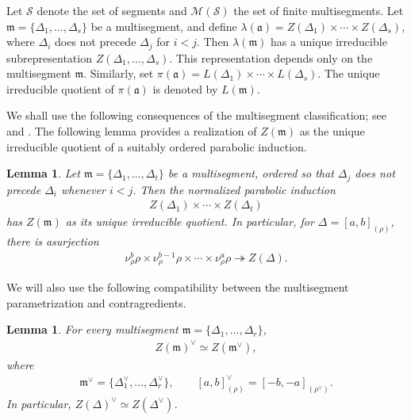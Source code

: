 \documentclass[11pt,leqno]{amsart}
\numberwithin{equation}{section}
\theoremstyle{plain}
\newtheorem{lemma}[theorem]{Lemma}
\theoremstyle{definition}
\theoremstyle{remark}
\newcommand{\onto}{\twoheadrightarrow}
\begin{document}
	
	Let $\mathcal S$ denote the set of segments and $\mathcal M(\mathcal S)$ the set of finite multisegments. 
	Let $\mathfrak m=\{\Delta_1,\ldots,\Delta_s\}$ be a multisegment, and define
	$\lambda(\mathfrak a)=Z(\Delta_1)\times\cdots\times Z(\Delta_s)$, where $\Delta_i$ does not precede $\Delta_j$ for $i<j$.
	Then $\lambda(\mathfrak m)$ has a unique irreducible
	subrepresentation $Z(\Delta_1,\ldots,\Delta_s)$.
	This representation depends only on the multisegment $\mathfrak m$.
	Similarly, set $\pi(\mathfrak a)=L(\Delta_1)\times\cdots\times L(\Delta_s)$.
	The unique irreducible quotient of $\pi(\mathfrak a)$ is denoted by $L(\mathfrak m)$.
	
	We shall use the following consequences of the multisegment
	classification; see \cite[Section 2]{DSV} and
	\cite{BR07, MS13, Tadic}.
	The following lemma provides a realization of
	$Z(\mathfrak m)$ as the unique irreducible quotient of a suitably
	ordered parabolic induction.
	\begin{lemma}\cite[Theorem 2.4]{EA16} \label{quotientclassfification}
		Let $\mathfrak m=\{\Delta_1,\ldots,\Delta_t\}$ be a multisegment, ordered so that $\Delta_j$ does not precede $\Delta_i$ whenever $i<j$.
		Then the normalized parabolic induction
		\begin{align*}
			Z(\Delta_1)\times\cdots\times Z(\Delta_t)   
		\end{align*}
		has $Z(\mathfrak m)$ as its unique irreducible quotient.
		In particular, for $\Delta=[a,b]_{(\rho)}$, there is asurjection
		\begin{align*}
			\nu_\rho^b\rho\times\nu_\rho^{b-1}\rho
			\times\cdots\times\nu_\rho^a\rho\onto Z(\Delta).
		\end{align*}
	\end{lemma}
	We will also use the following compatibility between the
	multisegment parametrization and contragredients.
	\begin{lemma}\cite[Proposition 5.10]{MS13}\label{prop:contragredient}
		For every multisegment $\mathfrak m=\{\Delta_1,\ldots,\Delta_r\}$,
		\begin{align*}
			Z(\mathfrak m)^\vee\simeq Z(\mathfrak m^\vee),
		\end{align*}
		where
		\begin{align*}
			\mathfrak m^\vee=\{\Delta_1^\vee,\ldots,\Delta_r^\vee\}, \qquad [a,b]_{(\rho)}^\vee=
			[-b,-a]_{(\rho^\vee)}.
		\end{align*}
		In particular, $Z(\Delta)^\vee\simeq Z(\Delta^\vee)$.
	\end{lemma}
\end{document}
